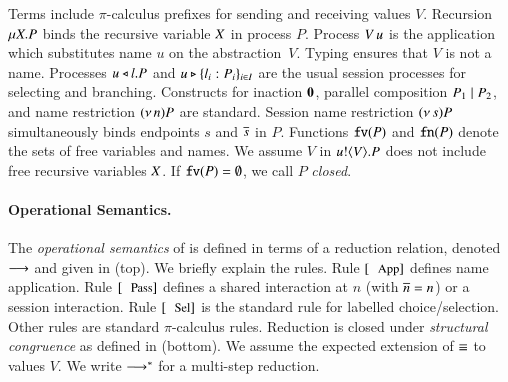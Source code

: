 \documentclass[runningheads]{llncs}
\begin{document}

Terms
include $\pi$-calculus prefixes for sending and receiving values $V$.
Recursion   $\mu X. P$ binds the recursive variable $X$ in process $P$.
Process 
$V\, {u}$ 
is the application
which substitutes name $u$ on the abstraction~$V$. 
Typing  ensures that $V$ is not a name.
Processes $u \triangleleft l . P$ and $u \triangleright \{l_i: P_i\}_{i \in I}$ are the
usual session processes for selecting and branching.
Constructs for 
inaction $\mathbf{0}$,  parallel composition $P_1 \;|\; P_2$, and 
name restriction $(\nu\, n) P$ are standard.
Session name restriction $(\nu\, s) P$ simultaneously binds endpoints $s$ and $\overline{s}$ in $P$.
Functions $\mathtt{fv}(P)$ and $\mathtt{fn}(P)$ denote the sets of free 
variables and names.
We assume $V$ in $u ! \langle V \rangle .{P}$ does not include free recursive 
variables $X$.
If $\mathtt{fv}(P) = \emptyset$, we call $P$ {\em closed}.






\paragraph{Operational Semantics.}
The \emph{operational semantics} of \HOp is defined in terms of a reduction relation, 
denoted $\longrightarrow$ and 
given in 
  (top).
 We briefly explain the rules. 
Rule $\orule{App}$ defines  name application.
Rule $\orule{Pass}$ defines a shared interaction at $n$ 
(with $\overline{n}=n$) or a session interaction.
Rule $\orule{Sel}$ is the standard rule for labelled choice/selection.%
Other rules are standard $\pi$-calculus rules.
Reduction is closed under \emph{structural congruence} as defined in  (bottom). 
We assume the expected extension of $\equiv$ to values $V$.
We write $\longrightarrow^\ast$ for a multi-step reduction.
\end{document}
